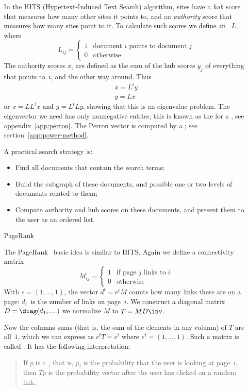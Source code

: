 In the HITS (Hypertext-Induced
Text Search) algorithm, sites have a \emph{hub} score that measures how many
other sites it points to, and an \emph{authority} score that measures
how many sites point to it. To calculate such scores we define an
~$L$, where
\[ L_{ij}=
\begin{cases}
  1&\mbox{document $i$ points to document $j$}\\
  0&\mbox{otherwise}
\end{cases}
\]
The authority scores $x_i$ are defined as the sum of the hub scores
$y_j$ of everything that points to~$i$, and the other way around. Thus
\[
\begin{array}{l}
  x=L^ty\\ y=Lx
\end{array}
\]
or $x=LL^tx$ and $y=L^tLy$, showing that this is an eigenvalue
problem. The eigenvector we need has only nonnegative entries; this is
known as the  for a
, see appendix~\ref{app:perron}. The
Perron vector is computed by a ; see
section~\ref{app:power-method}.

A practical search strategy is:
\begin{itemize}
\item Find all documents that contain the search terms;
\item Build the subgraph of these documents, and possible one or two
  levels of documents related to them;
\item Compute authority and hub scores on these documents, and present
  them to the user as an ordered list.
\end{itemize}

 {PageRank}

The PageRank~\cite{PageBrin:PageRank} basic idea is similar to
HITS. Again we define a connectivity matrix
\[ M_{ij}=
\begin{cases}
  1&\mbox{if page $j$ links to $i$}\\
  0&\mbox{otherwise}
\end{cases}
\]
With $e=(1,\ldots,1)$, the vector $d^t=e^tM$ counts how many links
there are on a page: $d_i$~is the number of links on page~$i$. We
construct a diagonal matrix $D=\diag(d_1,\ldots)$ we normalize $M$ to
$T=MD\inv$. 

Now the columns sums (that is, the sum of the elements in any column)
of $T$ are all~$1$, which we can express as $e^tT=e^t$ where
$e^t=(1,\ldots,1)$. Such a matrix is
called . It has the following
interpretation:
\begin{quote}
  If $p$ is a , that is, $p_i$ is the
  probability that the user is looking at page~$i$, then $Tp$ is the
  probability vector after the user has clicked on a random link.
\end{quote}

